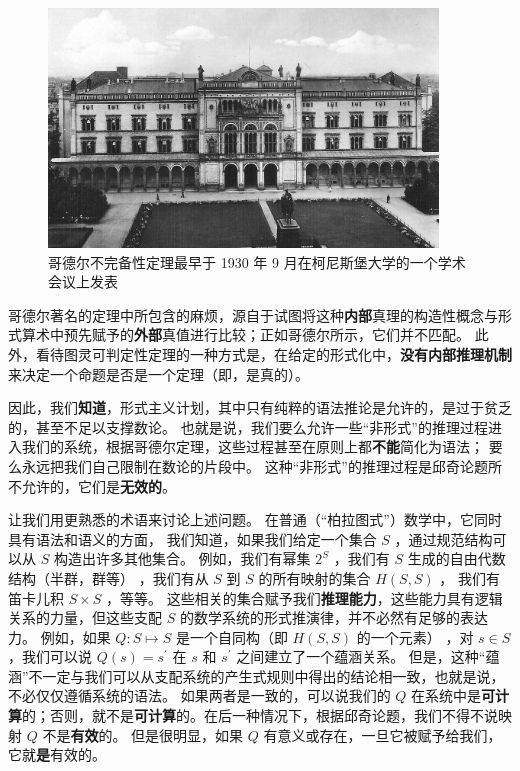 \documentclass[a4paper,12pt]{article}
\begin{document}
\begin{figure}[ht]
\centering
\includegraphics[height=2.5in]{images/konigsberger_university.jpg}
\caption{哥德尔不完备性定理最早于 1930 年 9 月在柯尼斯堡大学的一个学术会议上发表}
\end{figure}

哥德尔著名的定理\cite{GodelK1931}中所包含的麻烦，源自于试图将这种\textbf{内部}真理的构造性概念与\gls{形式算术}中预先赋予的\textbf{外部}真值进行比较；正如哥德尔所示，它们并不匹配。
此外，看待图灵可判定性定理\cite{TuringA1937}的一种方式是，在给定的\gls{形式化}中，\textbf{没有内部\gls{推理机制}}来决定一个\gls{命题}是否是一个\gls{定理}（即，是真的）。

因此，我们\textbf{知道}，\gls{形式主义}计划，其中只有纯粹的\gls{语法}推论是允许的，是过于贫乏的，甚至不足以支撑数论。
也就是说，我们要么允许一些“非形式”的\gls{推理过程}进入我们的系统，根据哥德尔定理，这些过程甚至在原则上都\textbf{不能}简化为\gls{语法}； 要么永远把我们自己限制在数论的片段中。
这种“非形式”的\gls{推理过程}是\gls{邱奇论题}所不允许的，它们是\textbf{无效的}。

让我们用更熟悉的术语来讨论上述问题。 在普通（“柏拉图式”）数学中，它同时具有\gls{语法}和\gls{语义}的方面，
我们知道，如果我们给定一个集合 $S$ ，通过规范结构可以从 $S$ 构造出许多其他集合。
例如，我们有幂集 $2^S$ ，我们有 $S$ \gls{生成}的自由代数结构（半群，群等） ，我们有从 $S$ 到 $S$ 的所有映射的集合 $H(S, S)$ ，
我们有笛卡儿积 $S \times S$ ，等等。
这些相关的集合赋予我们\textbf{\gls{推理能力}}，这些能力具有\gls{逻辑关系}的力量，但这些支配 $S$ 的数学系统的形式推演律，并不必然有足够的表达力。
例如，如果 $Q: S \mapsto S$ 是一个自同构（即 $H(S, S)$ 的一个元素） ，对 $s \in S $，我们可以说 $Q(s) = s^{\prime}$ 在 $s$ 和 $s^{\prime}$ 之间建立了一个\gls{蕴涵关系}。
但是，这种“\gls{蕴涵}”不一定与我们可以从支配系统的产生式规则中得出的结论相一致，也就是说，不必仅仅遵循系统的\gls{语法}。
如果两者是一致的，可以说我们的 $Q$ 在系统中是\textbf{\gls{可计算}}的；否则，就不是\textbf{可计算}的。在后一种情况下，根据\gls{邱奇论题}，我们不得不说映射 $Q$ 不是\textbf{有效}的。
但是很明显，如果 $Q$ 有意义或存在，一旦它被赋予给我们，它就\textbf{是}有效的。
\end{document}
